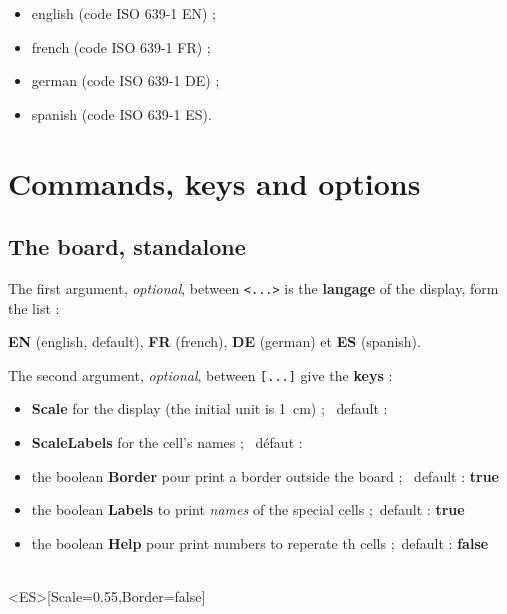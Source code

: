 \documentclass{article}
\newcommand\Cle[1]{{\bfseries\sffamily\textlangle #1\textrangle}}
\begin{document}
\begin{itemize}
	\item english (code ISO 639-1 EN) ;
	\item french (code ISO 639-1 FR) ;
	\item german (code ISO 639-1 DE) ;
	\item spanish (code ISO 639-1 ES).
\end{itemize}

\pagebreak

\section{Commands, keys and options}

\subsection{The board, standalone}

The first argument, \textit{optional}, between \texttt{<...>} is the \Cle{langage} of the display, form the list :

\hfill\Cle{EN} (english, default), \Cle{FR} (french), \Cle{DE} (german) et \Cle{ES} (spanish).\hfill~

\smallskip

The second argument, \textit{optional}, between \texttt{[...]} give the \Cle{keys} :

\begin{itemize}
	\item \Cle{Scale} for the display (the initial unit is 1~cm) ; \hfill~default : \Cle{1}
	\item \Cle{ScaleLabels} for the cell's names ; \hfill~défaut : \Cle{1}
	\item the boolean \Cle{Border} pour print a border outside the board ; \hfill~default : \Cle{true}
	\item the boolean \Cle{Labels} to print \textit{names} of the special cells ;\hfill~default : \Cle{true}
	\item the boolean \Cle{Help} pour print numbers to reperate th cells ;\hfill~default : \Cle{false}
\end{itemize}

\begin{PresentationCode}{}
\ScrabbleBoard[Labels=false,Scale=0.55]\\      %
\ScrabbleBoard<ES>[Scale=0.55,Border=false]     %
\end{PresentationCode}
\end{document}
